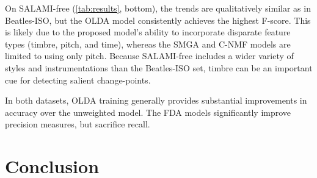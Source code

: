 \documentclass{article}
\begin{document}
On SALAMI-free (\cref{tab:results}, bottom), the trends are qualitatively similar as in Beatles-ISO, but the OLDA
model consistently achieves the highest F-score. 
This is likely due to the proposed model's ability to incorporate disparate feature types (timbre, pitch, and time), whereas the SMGA and C-NMF models are limited to using only pitch. 
Because SALAMI-free includes a wider variety of styles and instrumentations than the Beatles-ISO set, 
timbre can be an important cue for detecting salient change-points.

In both datasets, OLDA training generally provides substantial improvements in accuracy over the unweighted model. 
The FDA models significantly improve precision measures, but sacrifice recall.



\section{Conclusion}
\label{sec:conclusion}



\end{document}
